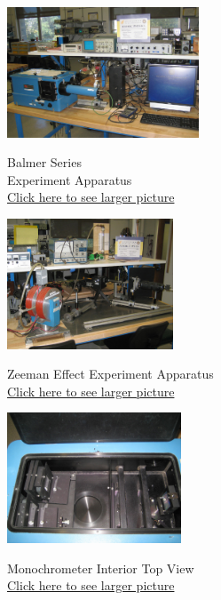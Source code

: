 \documentclass{../lab}
\begin{document}
\begin{figure}[H]
\captionsetup{justification=centering}
  \href{http://experimentationlab.berkeley.edu/sites/default/files/images/ATM_Balmer_3490-Crop-Lg.jpg}{\includegraphics[height=110pt,keepaspectratio]{images/ATM_Balmer_3490-Crop-Lg.jpg}}
  \caption{Balmer Series \\ Experiment Apparatus \\ \href{http://experimentationlab.berkeley.edu/sites/default/files/images/ATM_Balmer_3490-Crop-Lg.jpg}{Click here to see larger picture}}
  \label{fig:BalmerApparatus}
\endminipage\hfill
{}
  \href{http://experimentationlab.berkeley.edu/sites/default/files/images/ATM_ZeemanSetup_3492-Crop-Lg.jpg}{\includegraphics[height=110pt,keepaspectratio]{images/ATM_ZeemanSetup_3492-Crop-Lg.jpg}}
  \caption{Zeeman Effect Experiment Apparatus \\
  \href{http://experimentationlab.berkeley.edu/sites/default/files/images/ATM_ZeemanSetup_3492-Crop-Lg.jpg}{Click here to see larger picture}}
  \label{fig:ZeemanApparatus}
\endminipage\hfill
{}
  \href{http://experimentationlab.berkeley.edu/sites/default/files/images/ATM-mono-In-Topview_3501-Lg.jpg}{\includegraphics[height=110pt,keepaspectratio]{images/ATM-mono-In-Topview_3501-Lg.jpg}}
  \caption{Monochrometer Interior Top View\\ \href{http://experimentationlab.berkeley.edu/sites/default/files/images/ATM-mono-In-Topview_3501-Lg.jpg}{Click here to see larger picture}}\label{fig:MonochrometerInteriorTop}
\endminipage
\end{figure}
\end{document}
